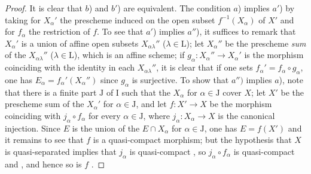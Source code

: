 \begin{proof}
It is clear that $b$) and $b'$) are equivalent.
The condition $a$) implies $a'$) by taking for $X_\alpha'$ the prescheme induced on the open subset $f^{-1}(X_\alpha)$ of $X'$ and for $f_\alpha$ the restriction of $f$.
To see that $a'$) implies $a''$), it suffices to remark that $X_\alpha'$ is a union of affine open subsets $X_{\alpha\lambda}''$ ($\lambda\in\mathrm{L}$); let $X_\alpha''$ be the prescheme \emph{sum} of the $X_{\alpha\lambda}''$ ($\lambda\in\mathrm{L}$), which is an affine scheme; if $g_\alpha:X_\alpha''\to X_\alpha'$ is the morphism coinciding with the identity in each $X_{\alpha\lambda}''$, it is clear that if one sets $f_\alpha'=f_\alpha\circ g_\alpha$, one has $E_\alpha=f_\alpha'(X_\alpha'')$ since $g_\alpha$ is surjective.
To show that $a'')$ implies $a$), note that there is a finite part $\mathrm{J}$ of $\mathrm{I}$ such that the $X_\alpha$ for $\alpha\in\mathrm{J}$ cover $X$; let $X'$ be the prescheme sum of the $X_\alpha'$ for $\alpha\in\mathrm{J}$, and let $f:X'\to X$ be the morphism coinciding with $j_\alpha\circ f_\alpha$ for every $\alpha\in\mathrm{J}$, where $j_\alpha:X_\alpha\to X$ is the canonical injection.
Since $E$ is the union of the $E\cap X_\alpha$ for $\alpha\in\mathrm{J}$, one has $E=f(X')$ and it remains to see that $f$ is a quasi-compact morphism; but the hypothesis that $X$ is quasi-separated implies that $j_\alpha$ is quasi-compact , so $j_\alpha\circ f_\alpha$ is quasi-compact  and , and hence so is $f$ .



\end{proof}
